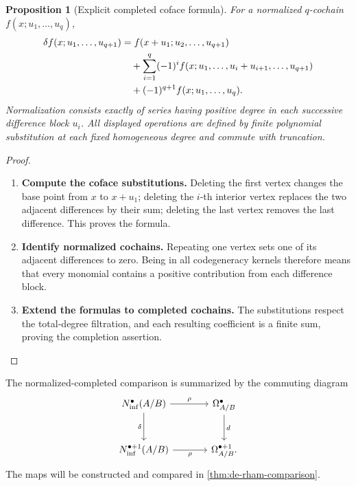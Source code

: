 \documentclass[11pt,a4paper]{article}
\numberwithin{algorithm}{section}
\numberwithin{equation}{section}
\newtheorem{proposition}[proposition]{Proposition}
\theoremstyle{definition}
\theoremstyle{remark}
\theoremstyle{plain}
\theoremstyle{definition}
\theoremstyle{plain}
\begin{document}
\begin{proposition}[Explicit completed coface formula]
\label{prop:completed-cofaces}
For a normalized $q$-cochain $f(x;u_1,\ldots,u_q)$,
\begin{align}
 \delta f(x;u_1,\ldots,u_{q+1})
 &=f(x+u_1;u_2,\ldots,u_{q+1})\notag\\
 &\quad+\sum_{i=1}^q(-1)^i
  f(x;u_1,\ldots,u_i+u_{i+1},\ldots,u_{q+1})\notag\\
 &\quad+(-1)^{q+1}f(x;u_1,\ldots,u_q).
 \label{eq:formal-cofaces}
\end{align}
Normalization consists exactly of series having positive degree
in each successive difference block $u_i$.  All displayed
operations are defined by finite polynomial substitution at each
fixed homogeneous degree and commute with truncation.
\end{proposition}
\begin{proof}\leavevmode
\begin{enumerate}[leftmargin=*,align=left]
\item \textbf{Compute the coface substitutions.}
Deleting the first vertex changes the base point from $x$ to
$x+u_1$; deleting the $i$-th interior vertex replaces the two
adjacent differences by their sum; deleting the last vertex removes
the last difference.  This proves the formula.

\item \textbf{Identify normalized cochains.}
Repeating one
vertex sets one of its adjacent differences to zero.  Being in
all codegeneracy kernels therefore means that every monomial
contains a positive contribution from each difference block.

\item \textbf{Extend the formulas to completed cochains.}
The substitutions respect the total-degree filtration, and each
resulting coefficient is a finite sum, proving the completion
assertion.
\end{enumerate}
\end{proof}

The normalized-completed comparison is summarized by the commuting diagram
\begin{equation}\label{eq:derham-comparison-diagram}
\begin{tikzcd}[column sep=large,row sep=large]
N^\bullet_{\mathrm{inf}}(A/B)
 \arrow[r,"{\rho}"] \arrow[d,"{\delta}"']
& \Omega^\bullet_{A/B} \arrow[d,"{d}"] \\
N^{\bullet+1}_{\mathrm{inf}}(A/B)
 \arrow[r,"{\rho}"']
& \Omega^{\bullet+1}_{A/B}.
\end{tikzcd}
\end{equation}
The maps will be constructed and compared in
\cref{thm:de-rham-comparison}.
\end{document}
